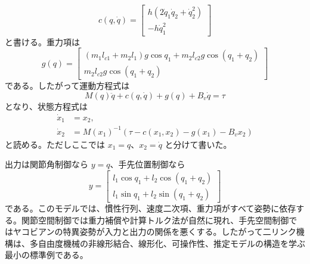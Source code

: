 \begin{equation}
  c(q,\dot{q})=
  \begin{bmatrix}
    h(2\dot{q}_1\dot{q}_2+\dot{q}_2^2)\\
    -h\dot{q}_1^2
  \end{bmatrix}
\end{equation}
と書ける。重力項は
\begin{equation}
  g(q)=
  \begin{bmatrix}
    (m_1l_{c1}+m_2l_1)g\cos q_1
    +m_2l_{c2}g\cos(q_1+q_2)\\
    m_2l_{c2}g\cos(q_1+q_2)
  \end{bmatrix}
\end{equation}
である。したがって運動方程式は
\begin{equation}
  M(q)\ddot{q}+c(q,\dot{q})+g(q)+B_v\dot{q}=\tau
\end{equation}
となり、状態方程式は
\begin{align}
  \dot{x}_1&=x_2,\\
  \dot{x}_2&=M(x_1)^{-1}
  \left(\tau-c(x_1,x_2)-g(x_1)-B_vx_2\right)
\end{align}
と読める。ただしここでは $x_1=q$、$x_2=\dot{q}$ と分けて書いた。

出力は関節角制御なら $y=q$、手先位置制御なら
\begin{equation}
  y=
  \begin{bmatrix}
    l_1\cos q_1+l_2\cos(q_1+q_2)\\
    l_1\sin q_1+l_2\sin(q_1+q_2)
  \end{bmatrix}
\end{equation}
である。このモデルでは、慣性行列、速度二次項、重力項がすべて姿勢に依存する。関節空間制御では重力補償や計算トルク法が自然に現れ、手先空間制御ではヤコビアンの特異姿勢が入力と出力の関係を悪くする。したがって二リンク機構は、多自由度機械の非線形結合、線形化、可操作性、推定モデルの構造を学ぶ最小の標準例である。
